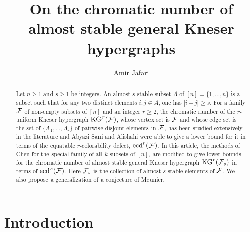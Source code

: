 \documentclass[a4paper,11pt]{article}
\begin{document}
\title{On the chromatic number of almost stable  general Kneser hypergraphs}
\author{Amir Jafari}
\maketitle



\begin{abstract}


 Let $n\ge 1$ and $s\ge 1$ be integers.  An almost $s$-stable subset $A$ of $[n]=\{1,\dots,n\}$ is a subset such that for any two distinct elements $i, j\in A$, one has $|i-j|\ge s$. For a family $\cal F$ of non-empty subsets of $[n]$ and an integer $r\ge 2$, the chromatic number of the $r$-uniform Kneser hypergraph $\mbox{KG}^r({\cal F})$, whose vertex set is  $\cal F$ and whose edge set is the set of $\{A_1,\dots, A_r\}$ of pairwise disjoint elements in $\cal F$, has been studied extensively in the literature and Abyazi Sani and Alishahi were able to give a lower bound for it in terms of the equatable $r$-colorability defect, $\mbox{ecd}^r({\cal F})$. In this article, the methods of Chen for the special family of all $k$-subsets of $[n]$, are modified to give lower bounds for the chromatic number of almost stable general Kneser hypergraph $\mbox{KG}^r({\cal F}_s)$ in terms of $\mbox{ecd}^s({\cal F})$. Here ${\cal F}_s$ is the collection of almost $s$-stable elements of $\cal F$. We also propose a generalization of a conjecture of Meunier.
 \end{abstract}

\section{Introduction}
\end{document}
